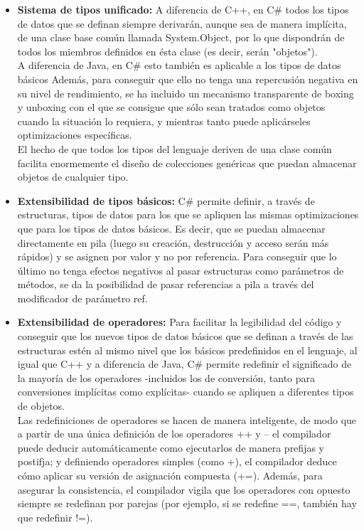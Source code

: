 \begin{itemize}
	\item \textbf{Sistema de tipos unificado: } A diferencia de C++, en C\# todos los tipos de datos que se definan siempre derivar\'an, aunque sea de manera impl\'icita, de una clase base com\'un llamada System.Object, por lo que dispondr\'an de todos los miembros definidos en \'esta clase (es decir, ser\'an "objetos").\\

	A diferencia de Java, en C\# esto tambi\'en es aplicable a los tipos de datos b\'asicos Adem\'as, para conseguir que ello no tenga una repercusi\'on negativa en su nivel de rendimiento, se ha incluido un mecanismo transparente de boxing y unboxing con el que se consigue que s\'olo sean tratados como objetos cuando la situaci\'on lo requiera, y mientras tanto puede aplic\'arseles optimizaciones espec\'ificas.\\

	El hecho de que todos los tipos del lenguaje deriven de una clase com\'un facilita enormemente el dise\~no de colecciones gen\'ericas que puedan almacenar objetos de cualquier tipo. 

	\item \textbf{Extensibilidad de tipos b\'asicos: }  C\# permite definir, a trav\'es de estructuras, tipos de datos para los que se apliquen las mismas optimizaciones que para los tipos de datos b\'asicos. Es decir, que se puedan almacenar directamente en pila (luego su creaci\'on, destrucci\'on y acceso ser\'an m\'as r\'apidos) y se asignen por valor y no por referencia. Para conseguir que lo \'ultimo no tenga efectos negativos al pasar estructuras como par\'ametros de m\'etodos, se da la posibilidad de pasar referencias a pila a trav\'es del modificador de par\'ametro ref. 

	\item \textbf{Extensibilidad de operadores: } Para facilitar la legibilidad del c\'odigo y conseguir que los nuevos tipos de datos b\'asicos que se definan a trav\'es de las estructuras est\'en al mismo nivel que los b\'asicos predefinidos en el lenguaje, al igual que C++ y a diferencia de Java, C\# permite redefinir el significado de la mayor\'ia de los operadores -incluidos los de conversi\'on, tanto para conversiones impl\'icitas como expl\'icitas- cuando se apliquen a diferentes tipos de objetos.\\

	Las redefiniciones de operadores se hacen de manera inteligente, de modo que a partir de una \'unica definici\'on de los operadores ++ y -- el compilador puede deducir autom\'aticamente como ejecutarlos de manera prefijas y postifja; y definiendo operadores simples (como +), el compilador deduce c\'omo aplicar su versi\'on de asignaci\'on compuesta (+=). Adem\'as, para asegurar la consistencia, el compilador vigila que los operadores con opuesto siempre se redefinan por parejas (por ejemplo, si se redefine ==, tambi\'en hay que redefinir !=).\\


\end{itemize}
